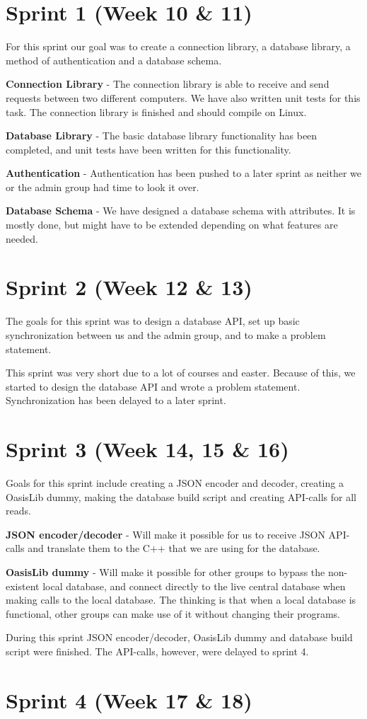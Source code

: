 \section{Sprint 1 (Week 10 \& 11)}
For this sprint our goal was to create a connection library, a database library, a method of authentication and a database schema.

\textbf{Connection Library} - The connection library is able to receive and send requests between two different computers. We have also written unit tests for this task. The connection library is finished and should compile on Linux.

\textbf{Database Library} - The basic database library functionality has been completed, and unit tests have been written for this functionality.

\textbf{Authentication} - Authentication has been pushed to a later sprint as neither we or the admin group had time to look it over.

\textbf{Database Schema} - We have designed a database schema with attributes. It is mostly done, but might have to be extended depending on what features are needed.

\section{Sprint 2 (Week 12 \& 13)}
The goals for this sprint was to design a database API, set up basic synchronization between us and the admin group, and to make a problem statement.

This sprint was very short due to a lot of courses and easter. Because of this, we started to design the database API and wrote a problem statement. Synchronization has been delayed to a later sprint.

\section{Sprint 3 (Week 14, 15 \& 16)}
Goals for this sprint include creating a JSON encoder and decoder, creating a OasisLib dummy, making the database build script and creating API-calls for all reads.

\textbf{JSON encoder/decoder} - Will make it possible for us to receive JSON API-calls and translate them to the C++ that we are using for the database.

\textbf{OasisLib dummy} - Will make it possible for other groups to bypass the non-existent local database, and connect directly to the live central database when making calls to the local database. The thinking is that when a local database is functional, other groups can make use of it without changing their programs.

During this sprint JSON encoder/decoder, OasisLib dummy and database build script were finished. The API-calls, however, were delayed to sprint 4.

\section{Sprint 4 (Week 17 \& 18)}